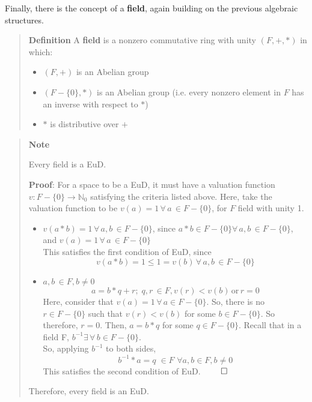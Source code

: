 \documentclass[letterpaper,12pt,titlepage,oneside,final]{book}
\newenvironment{defn}{\begin{quote}%
  \textbf{Definition }%
  \quad
}{%
\end{quote}%
}
\newenvironment{note}{\begin{quote}%
  \textbf{Note }%
  \quad
}{%
\end{quote}%
}
\begin{document}
Finally, there is the concept of a \textbf{field}, again building on the previous algebraic structures. 

\begin{defn}\label{defn: Field}
  A \textbf{field} is a nonzero commutative ring with unity ${(F, +, *)}$ in which:
  \begin{itemize}
    \item ${(F, +)}$ is an Abelian group
    \item ${(F - \{0\}, *)}$ is an Abelian group (i.e. every nonzero element in ${F}$ has an inverse with respect to ${*}$)
    \item ${*}$ is distributive over ${+}$
  \end{itemize}
\end{defn}

\begin{note}
  Every field is a EuD.

  \textbf{Proof}: For a space to be a EuD, it must have a valuation function ${v : F - \{0\} \rightarrow \mathbb{N}_0}$ satisfying the criteria listed above.
  Here, take the valuation function to be ${v(a) = 1 \, \forall \, a \, \in F - \{0\}}$, for ${F}$ field with unity 1.    
  \begin{itemize}
    \item ${v(a * b) = 1 \, \forall \, a, b \, \in F - \{0\}}$, since ${a * b \in F - \{0\} \forall \, a, b \, \in F - \{0\}}$, and ${v(a) = 1 \, \forall \, a \, \in F - \{0\}}$ \\ This satisfies the first condition of EuD, since $${v(a * b) = 1 \leq 1 = v(b) \, \forall \, a, b \, \in F - \{0\}}$$
    \item ${a, b \, \in F, b \neq 0}$ \begin{equation*} a = b * q + r; \; q, r \, \in F, v(r) < v(b) \, \text{or} \, r = 0 \end{equation*} Here, consider that ${v(a) = 1 \, \forall \, a \in F - \{0\}}$.  So, there is no ${r \in F - \{0\}}$ such that ${v(r) < v(b)}$ for some ${b \in F - \{0\}}$.  So therefore, ${r = 0}$.  Then, ${a = b*q}$ for some ${q \in F - \{0\}}$.  Recall that in a field F, ${b^{-1} \exists \, \forall \, b \in F - \{0\}}$. \\ So, applying ${b^{-1}}$ to both sides, \begin{equation*} b^{-1} * a = q \; \in F \,\, \forall a, b \in F, b \neq 0 \end{equation*}  This satisfies the second condition of EuD. ${\qed}$
  \end{itemize} 

  Therefore, every field is an EuD.
\end{note}
\end{document}
